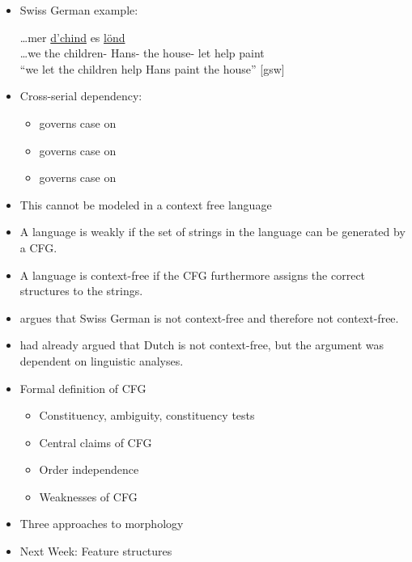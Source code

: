 \documentclass[a4paper,landscape,headrule,footrule]{foils}
\begin{document}
\begin{itemize}
\item Swiss German example:
  \begin{exe}
    \ex \gll \ldots mer \uline{d’chind}  es  \uline{l\"ond}  \\
    \ldots we {the children-} Hans- the house- let help paint \\
    \trans ``we let the children help Hans paint the house'' [gsw]
  \end{exe}
\item Cross-serial dependency:
\begin{itemize}
\item {} governs case on 
\item {} governs case on 
\item {} governs case on 
\end{itemize}
\item This cannot be modeled in a context free language
\end{itemize}

\begin{itemize}
\item A language is weakly  if the set of
strings in the language can be generated by a CFG.
\item A language is  context-free if the CFG
furthermore assigns the correct structures to the
strings.
\item \citet{shieber:1985} argues that Swiss German is not 
context-free and therefore not  context-free.
\item \citet{bresnan:kaplan:peters:zaenen:1982} had already argued that
Dutch is not  context-free, but the argument was
dependent on linguistic analyses.
\end{itemize}






\begin{itemize}
\item Formal definition of CFG
  \begin{itemize}
  \item Constituency, ambiguity, constituency tests
  \item Central claims of CFG
  \item Order independence
  \item Weaknesses of CFG
  \end{itemize}
\item Three approaches to morphology
\item Next Week: Feature structures
\end{itemize}
\end{document}
